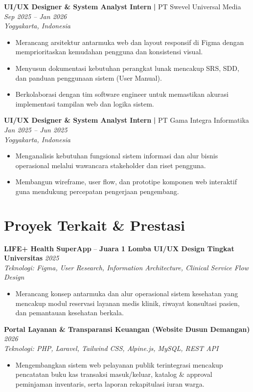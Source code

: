 \documentclass[letterpaper,10pt]{article}
\begin{document}
\noindent
\textbf{UI/UX Designer \& System Analyst Intern} \textbf{|} PT Swevel Universal Media \hfill \textit{Sep 2025 -- Jan 2026} \\
\textit{Yogyakarta, Indonesia}
\begin{itemize}
  \item Merancang arsitektur antarmuka web dan layout responsif di Figma dengan memprioritaskan kemudahan pengguna dan konsistensi visual.
  \item Menyusun dokumentasi kebutuhan perangkat lunak mencakup SRS, SDD, dan panduan penggunaan sistem (User Manual).
  \item Berkolaborasi dengan tim software engineer untuk memastikan akurasi implementasi tampilan web dan logika sistem.
\end{itemize}

\noindent
\textbf{UI/UX Designer \& System Analyst Intern} \textbf{|} PT Gama Integra Informatika \hfill \textit{Jan 2025 -- Jun 2025} \\
\textit{Yogyakarta, Indonesia}
\begin{itemize}
  \item Menganalisis kebutuhan fungsional sistem informasi dan alur bisnis operasional melalui wawancara stakeholder dan riset pengguna.
  \item Membangun wireframe, user flow, dan prototipe komponen web interaktif guna mendukung percepatan pengerjaan pengembang.
\end{itemize}

\section{Proyek Terkait \& Prestasi}

\noindent
\textbf{LIFE+ Health SuperApp} -- \textbf{Juara 1 Lomba UI/UX Design Tingkat Universitas} \hfill \textit{2025} \\
\textit{Teknologi: Figma, User Research, Information Architecture, Clinical Service Flow Design}
\begin{itemize}
  \item Merancang konsep antarmuka dan alur operasional sistem kesehatan yang mencakup modul reservasi layanan medis klinik, riwayat konsultasi pasien, dan pemantauan kesehatan berkala.
\end{itemize}

\noindent
\textbf{Portal Layanan \& Transparansi Keuangan (Website Dusun Demangan)} \hfill \textit{2026} \\
\textit{Teknologi: PHP, Laravel, Tailwind CSS, Alpine.js, MySQL, REST API}
\begin{itemize}
  \item Mengembangkan sistem web pelayanan publik terintegrasi mencakup pencatatan buku kas transaksi masuk/keluar, katalog \& approval peminjaman inventaris, serta laporan rekapitulasi iuran warga.
\end{itemize}
\end{document}
